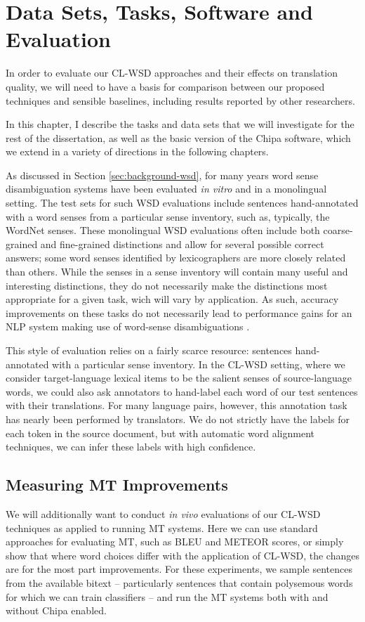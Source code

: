 \chapter{Data Sets, Tasks, Software and Evaluation}
\label{chap:evaluation}
In order to evaluate our CL-WSD approaches and their effects on translation
quality, we will need to have a basis for comparison between our proposed
techniques and sensible baselines, including results reported by other
researchers.

In this chapter, I describe the tasks and data sets that we will investigate
for the rest of the dissertation, as well as the basic version of the Chipa
software, which we extend in a variety of directions in the following chapters.

As discussed in Section \ref{sec:background-wsd}, for many years word sense
disambiguation systems have been evaluated \emph{in vitro} and in a monolingual
setting. The test sets for such WSD evaluations include sentences
hand-annotated with a word senses from a particular sense inventory, such as,
typically, the WordNet senses. These monolingual WSD evaluations often include
both coarse-grained and fine-grained distinctions and allow for several
possible correct answers; some word senses identified by lexicographers are
more closely related than others.  While the senses in a sense inventory will
contain many useful and interesting distinctions, they do not necessarily make
the distinctions most appropriate for a given task, wich will vary by
application. As such, accuracy improvements on these tasks do not necessarily
lead to performance gains for an NLP system making use of word-sense
disambiguations \cite{resnikwsdapplications}.

This style of evaluation relies on a fairly scarce resource: sentences
hand-annotated with a particular sense inventory.
In the CL-WSD setting, where we consider target-language lexical items to be
the salient senses of source-language words, we could also ask annotators to
hand-label each word of our test sentences with their translations.
For many language pairs, however, this annotation task has nearly been
performed by translators. We do not strictly have the labels for each token in
the source document, but with automatic word alignment techniques, we can infer
these labels with high confidence.

\section{Measuring MT Improvements}
We will additionally want to conduct \emph{in vivo} evaluations of our CL-WSD
techniques as applied to running MT systems. Here we can use standard
approaches for evaluating MT, such as BLEU and METEOR scores, or simply show
that where word choices differ with the application of CL-WSD, the changes are
for the most part improvements. For these experiments, we sample sentences
from the available bitext -- particularly sentences that contain polysemous
words for which we can train classifiers -- and run the MT systems both with
and without Chipa enabled.

